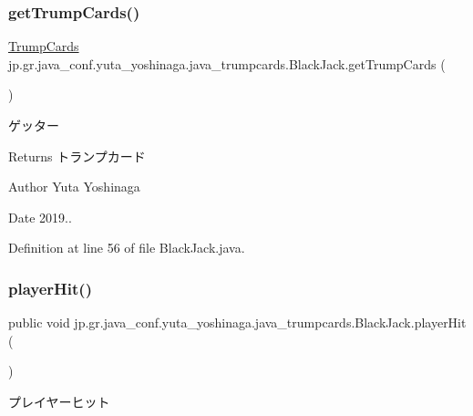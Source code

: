 \subsubsection{\texorpdfstring{get\+Trump\+Cards()}{getTrumpCards()}}
{\footnotesize\ttfamily \hyperlink{classjp_1_1gr_1_1java__conf_1_1yuta__yoshinaga_1_1java__trumpcards_1_1_trump_cards}{Trump\+Cards} jp.\+gr.\+java\+\_\+conf.\+yuta\+\_\+yoshinaga.\+java\+\_\+trumpcards.\+Black\+Jack.\+get\+Trump\+Cards (\begin{DoxyParamCaption}{ }\end{DoxyParamCaption})}



ゲッター 

\begin{DoxyReturn}{Returns}
トランプカード 
\end{DoxyReturn}
\begin{DoxyAuthor}{Author}
Yuta Yoshinaga 
\end{DoxyAuthor}
\begin{DoxyDate}{Date}
2019.. 
\end{DoxyDate}


Definition at line 56 of file Black\+Jack.\+java.

\mbox{\label{classjp_1_1gr_1_1java__conf_1_1yuta__yoshinaga_1_1java__trumpcards_1_1_black_jack_a4b8f2248ac868b5d3b9506fb0ece0ea2}} 
\subsubsection{\texorpdfstring{player\+Hit()}{playerHit()}}
{\footnotesize\ttfamily public void jp.\+gr.\+java\+\_\+conf.\+yuta\+\_\+yoshinaga.\+java\+\_\+trumpcards.\+Black\+Jack.\+player\+Hit (\begin{DoxyParamCaption}{ }\end{DoxyParamCaption})}



プレイヤーヒット 

